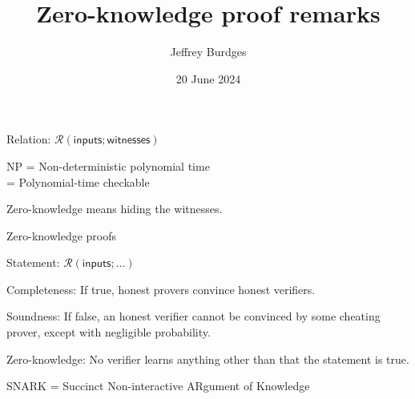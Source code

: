 \documentclass{beamer}
\title{Zero-knowledge proof remarks}
\author{Jeffrey Burdges}
\date{20 June 2024}
\begin{document}
\maketitle




\begin{frame}

Relation: \quad $\mathcal{R}( \mathsf{inputs} ; \mathsf{witnesses} )$ \\ \bigskip

NP = Non-deterministic polynomial time \\ \smallskip
\hspace{15pt}  = Polynomial-time checkable \\ \bigskip

Zero-knowledge means hiding the witnesses.

\end{frame}



\begin{frame}{Zero-knowledge proofs}


Statement: \quad $\mathcal{R}( \mathsf{inputs} ; \ldots )$ \\ \bigskip

Completeness: If true, honest provers convince honest verifiers. \\ \medskip

Soundness: If false, an honest verifier cannot be convinced by
 some cheating prover, except with negligible probability. \\ \medskip

Zero-knowledge: No verifier learns anything other than
 that the statement is true.

\bigskip\bigskip

SNARK = Succinct Non-interactive ARgument of Knowledge \\

        
\end{frame}
\end{document}
